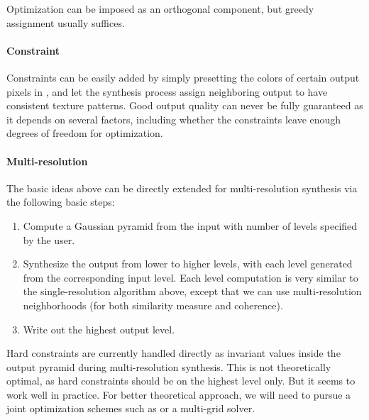 Optimization \cite{Kwatra:2005:TOE,Han:2006:TDO} can be imposed as an orthogonal component, but greedy assignment usually suffices.

\paragraph{Constraint}

Constraints can be easily added by simply presetting the colors of certain output pixels in , and let the synthesis process assign neighboring output to have consistent texture patterns.
Good output quality can never be fully guaranteed as it depends on several factors, including whether the constraints leave enough degrees of freedom for optimization.

\paragraph{Multi-resolution}

The basic ideas above can be directly extended for multi-resolution synthesis \cite{Wei:2000:FTS} via the following basic steps:
\begin{enumerate}
\item
Compute a Gaussian pyramid from the input with number of levels specified by the user.

\item
Synthesize the output from lower to higher levels, with each level generated from the corresponding input level.
Each level computation is very similar to the single-resolution algorithm above, except that we can use multi-resolution neighborhoods (for both similarity measure and coherence).

\item
Write out the highest output level.
\end{enumerate}

Hard constraints are currently handled directly as invariant values inside the output pyramid during multi-resolution synthesis.
This is not theoretically optimal, as hard constraints should be on the highest level only.
But it seems to work well in practice.
For better theoretical approach, we will need to pursue a joint optimization schemes such as \cite{Kwatra:2005:TOE,Han:2006:TDO} or a multi-grid solver.
